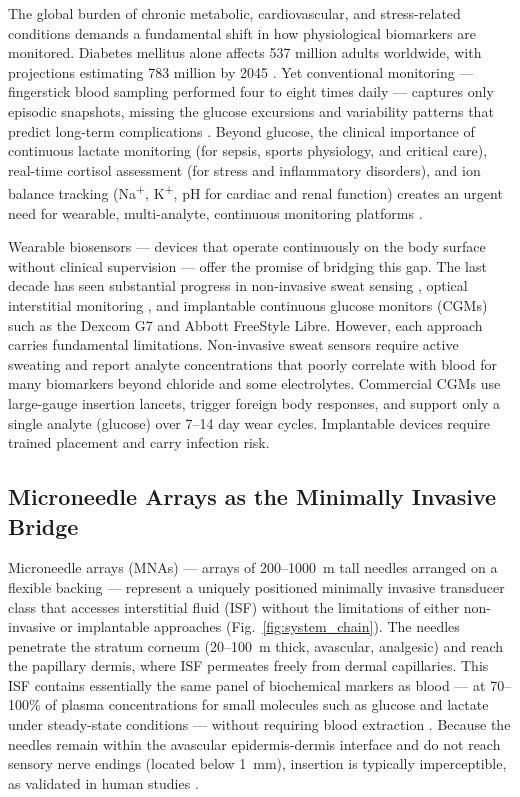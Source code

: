 \documentclass[review,1p]{elsarticle}
\begin{document}
The global burden of chronic metabolic, cardiovascular, and stress-related conditions demands a fundamental shift in how physiological biomarkers are monitored. Diabetes mellitus alone affects 537 million adults worldwide, with projections estimating 783 million by 2045 \cite{IDF2021}. Yet conventional monitoring — fingerstick blood sampling performed four to eight times daily — captures only episodic snapshots, missing the glucose excursions and variability patterns that predict long-term complications \cite{TeymourianReview2021}. Beyond glucose, the clinical importance of continuous lactate monitoring (for sepsis, sports physiology, and critical care), real-time cortisol assessment (for stress and inflammatory disorders), and ion balance tracking (Na\textsuperscript{+}, K\textsuperscript{+}, pH for cardiac and renal function) creates an urgent need for wearable, multi-analyte, continuous monitoring platforms \cite{Min2021NFC}.

Wearable biosensors — devices that operate continuously on the body surface without clinical supervision — offer the promise of bridging this gap. The last decade has seen substantial progress in non-invasive sweat sensing \cite{Bandodkar2021SEBS}, optical interstitial monitoring \cite{Pickup2005ISF}, and implantable continuous glucose monitors (CGMs) such as the Dexcom G7 and Abbott FreeStyle Libre. However, each approach carries fundamental limitations. Non-invasive sweat sensors require active sweating and report analyte concentrations that poorly correlate with blood for many biomarkers beyond chloride and some electrolytes. Commercial CGMs use large-gauge insertion lancets, trigger foreign body responses, and support only a single analyte (glucose) over 7--14 day wear cycles. Implantable devices require trained placement and carry infection risk.

\subsection{Microneedle Arrays as the Minimally Invasive Bridge}
\label{subsec:mna_bridge}

Microneedle arrays (MNAs) — arrays of 200--1000~\textmu{}m tall needles arranged on a flexible backing — represent a uniquely positioned minimally invasive transducer class that accesses interstitial fluid (ISF) without the limitations of either non-invasive or implantable approaches (Fig.~\ref{fig:system_chain}). The needles penetrate the stratum corneum (20--100~\textmu{}m thick, avascular, analgesic) and reach the papillary dermis, where ISF permeates freely from dermal capillaries. This ISF contains essentially the same panel of biochemical markers as blood — at 70--100\% of plasma concentrations for small molecules such as glucose and lactate under steady-state conditions — without requiring blood extraction \cite{Wang2006MNAreview}. Because the needles remain within the avascular epidermis-dermis interface and do not reach sensory nerve endings (located below 1~mm), insertion is typically imperceptible, as validated in human studies \cite{Tehrani2022NatBiomedEng}.
\end{document}
